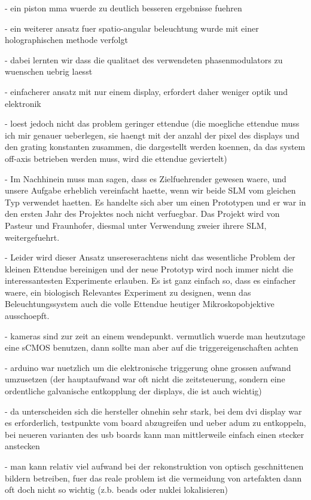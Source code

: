 \documentclass[oneside,a4paper,12pt,BCOR20mm,DIV14]{scrbook} %
\begin{document}
  - ein piston mma wuerde zu deutlich besseren ergebnisse fuehren

- ein weiterer ansatz fuer spatio-angular beleuchtung wurde mit einer
  holographischen methode verfolgt

  - dabei lernten wir dass die qualitaet des verwendeten
    phasenmodulators zu wuenschen uebrig laesst

  - einfacherer ansatz mit nur einem display, erfordert daher weniger
    optik und elektronik

  - loest jedoch nicht das problem geringer ettendue (die moegliche
    ettendue muss ich mir genauer ueberlegen, sie haengt mit der
    anzahl der pixel des displays und den grating konstanten zusammen,
    die dargestellt werden koennen, da das system off-axis betrieben
    werden muss, wird die ettendue geviertelt)

- Im Nachhinein muss man sagen, dass es Zielfuehrender gewesen
    waere, und unsere Aufgabe erheblich vereinfacht haette, wenn wir
    beide SLM vom gleichen Typ verwendet haetten. Es handelte sich
    aber um einen Prototypen und er war in den ersten Jahr des
    Projektes noch nicht verfuegbar. Das Projekt wird von Pasteur und
    Fraunhofer, diesmal unter Verwendung zweier ihrere SLM,
    weitergefuehrt. 

  - Leider wird dieser Ansatz unsereserachtens nicht das wesentliche
    Problem der kleinen Ettendue bereinigen und der neue Prototyp wird
    noch immer nicht die interessantesten Experimente erlauben. Es ist
    ganz einfach so, dass es einfacher waere, ein biologisch
    Relevantes Experiment zu designen, wenn das Beleuchtungssystem
    auch die volle Ettendue heutiger Mikroskopobjektive ausschoepft.

- kameras sind zur zeit an einem wendepunkt. vermutlich wuerde man
  heutzutage eine sCMOS benutzen, dann sollte man aber auf die
  triggereigenschaften achten

- arduino war nuetzlich um die elektronische triggerung ohne grossen
  aufwand umzusetzen (der hauptaufwand war oft nicht die
  zeitsteuerung, sondern eine ordentliche galvanische entkopplung der
  displays, die ist auch wichtig)

  - da unterscheiden sich die hersteller ohnehin sehr stark, bei dem
    dvi display war es erforderlich, testpunkte vom board abzugreifen
    und ueber adum zu entkoppeln, bei neueren varianten des usb boards
    kann man mittlerweile einfach einen stecker anstecken

- man kann relativ viel aufwand bei der rekonstruktion von optisch
  geschnittenen bildern betreiben, fuer das reale problem ist die
  vermeidung von artefakten dann oft doch nicht so wichtig (z.b. beads
  oder nuklei lokalisieren)
\end{document}
